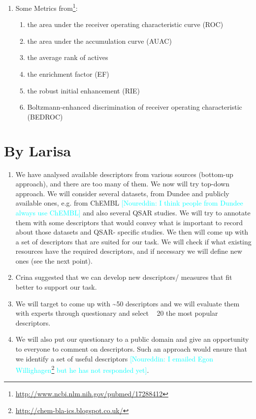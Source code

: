 \documentclass[a4paper,12pt, english]{article}
\newcommand{\kibitz}[2]{\ifnum\Comments=1\textcolor{#1}{#2}\fi}
\newcommand{\ns}[1]{\kibitz{cyan}     {[Noureddin: #1]}}
\begin{document}
\begin{enumerate}
	\item Some Metrics from\footnote{\url{http://www.ncbi.nlm.nih.gov/pubmed/17288412}}:
	\begin{enumerate}
	\item the area under the receiver operating characteristic curve (ROC)
	\item the area under the accumulation curve (AUAC)
	\item the average rank of actives
	\item the enrichment factor (EF)
	\item the robust initial enhancement (RIE)
	\item Boltzmann-enhanced discrimination of receiver operating characteristic (BEDROC)
	\end{enumerate}
\end{enumerate}    

\section{By Larisa}
\begin{enumerate}
	\item We have analysed available descriptors from various sources (bottom-up approach), and there are too many of them. We now will try top-down approach. We will consider several datasets, from Dundee and publicly available ones, e.g. from ChEMBL \ns{I think people from Dundee always use ChEMBL} and also several QSAR studies. We will try to annotate them with some descriptors that would convey what is important to record about those datasets and QSAR- specific studies. We then will come up with a set of descriptors that are suited for our task. We will check if what existing resources have the required descriptors, and if necessary we will define new ones (see the next point).
	\item Crina suggested that we can develop new descriptors/ measures that fit better to support our task.
	\item We will target to come up with \textasciitilde50 descriptors and we will evaluate them with experts through questionary and select  ~ 20 the most popular descriptors.
	\item We will also put our questionary to a public domain and give an opportunity to everyone to comment on descriptors. Such an approach would ensure that we identify a set of useful descriptors \ns{I emailed Egon Willighagen\footnote{\url{http://chem-bla-ics.blogspot.co.uk/}} but he has not responded yet}.
\end{enumerate}  
\end{document}
